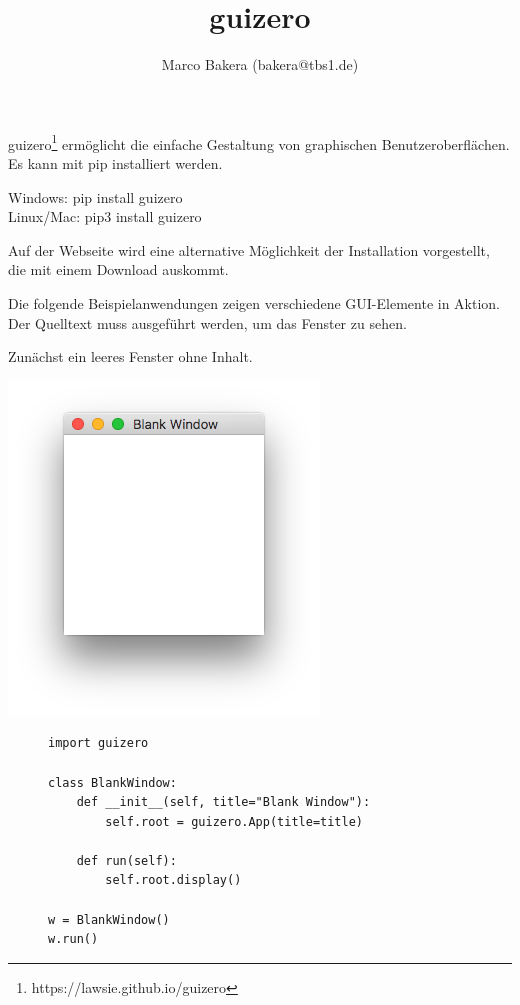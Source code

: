 \documentclass{tufte-handout}
\title{guizero}
\date{}
\author{Marco Bakera (bakera@tbs1.de)}
\begin{document}
\maketitle

guizero\footnote{https://lawsie.github.io/guizero} ermöglicht die einfache
Gestaltung von graphischen Benutzeroberflächen.
Es kann mit pip installiert werden.
\begin{marginfigure}
 Windows: pip install guizero\\ \noindent
 Linux/Mac: pip3 install guizero
\end{marginfigure}
  
Auf der Webseite wird eine alternative Möglichkeit der Installation
vorgestellt, die mit einem Download auskommt.
 
 
Die folgende Beispielanwendungen zeigen verschiedene GUI-Elemente in Aktion.
Der Quelltext muss ausgeführt werden, um das Fenster zu sehen. 
 
Zunächst ein leeres Fenster ohne Inhalt.

\begin{marginfigure}[3cm]
	\includegraphics[width=\textwidth]{../blank_window}
\end{marginfigure}

\begin{figure}
\begin{lstlisting}
import guizero

class BlankWindow:
    def __init__(self, title="Blank Window"):
        self.root = guizero.App(title=title)

    def run(self):
        self.root.display()

w = BlankWindow()
w.run()
\end{lstlisting}
\end{figure} 
\end{document}
